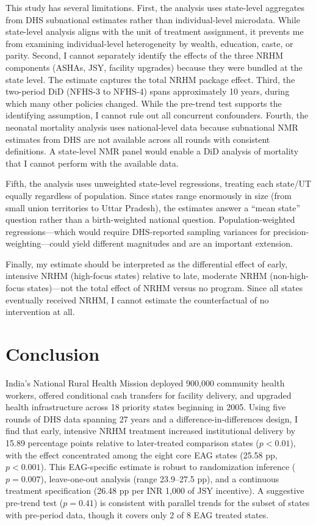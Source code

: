 \documentclass[12pt]{article}
\begin{document}
This study has several limitations. First, the analysis uses state-level aggregates from DHS subnational estimates rather than individual-level microdata. While state-level analysis aligns with the unit of treatment assignment, it prevents me from examining individual-level heterogeneity by wealth, education, caste, or parity. Second, I cannot separately identify the effects of the three NRHM components (ASHAs, JSY, facility upgrades) because they were bundled at the state level. The estimate captures the total NRHM package effect. Third, the two-period DiD (NFHS-3 to NFHS-4) spans approximately 10 years, during which many other policies changed. While the pre-trend test supports the identifying assumption, I cannot rule out all concurrent confounders. Fourth, the neonatal mortality analysis uses national-level data because subnational NMR estimates from DHS are not available across all rounds with consistent definitions. A state-level NMR panel would enable a DiD analysis of mortality that I cannot perform with the available data.

Fifth, the analysis uses unweighted state-level regressions, treating each state/UT equally regardless of population. Since states range enormously in size (from small union territories to Uttar Pradesh), the estimates answer a ``mean state'' question rather than a birth-weighted national question. Population-weighted regressions---which would require DHS-reported sampling variances for precision-weighting---could yield different magnitudes and are an important extension.

Finally, my estimate should be interpreted as the differential effect of early, intensive NRHM (high-focus states) relative to late, moderate NRHM (non-high-focus states)---not the total effect of NRHM versus no program. Since all states eventually received NRHM, I cannot estimate the counterfactual of no intervention at all.


\section{Conclusion}
\label{sec:conclusion}

India's National Rural Health Mission deployed 900,000 community health workers, offered conditional cash transfers for facility delivery, and upgraded health infrastructure across 18 priority states beginning in 2005. Using five rounds of DHS data spanning 27 years and a difference-in-differences design, I find that early, intensive NRHM treatment increased institutional delivery by 15.89 percentage points relative to later-treated comparison states ($p < 0.01$), with the effect concentrated among the eight core EAG states (25.58 pp, $p < 0.001$). This EAG-specific estimate is robust to randomization inference ($p = 0.007$), leave-one-out analysis (range 23.9--27.5 pp), and a continuous treatment specification (26.48 pp per INR 1,000 of JSY incentive). A suggestive pre-trend test ($p = 0.41$) is consistent with parallel trends for the subset of states with pre-period data, though it covers only 2 of 8 EAG treated states.
\end{document}
